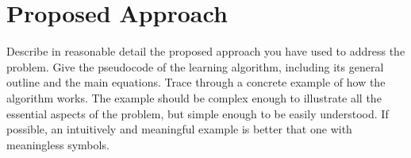 
\chapter{Proposed Approach}\label{ch:contribution}

Describe in reasonable detail the proposed approach you have used to address the problem. Give the pseudocode of the learning algorithm, including its general outline and the main equations. Trace through a concrete example of how the algorithm works. The example should be complex enough to illustrate all the essential aspects of the problem, but simple enough to be easily understood. If possible, an intuitively and meaningful example is better that one with meaningless symbols.